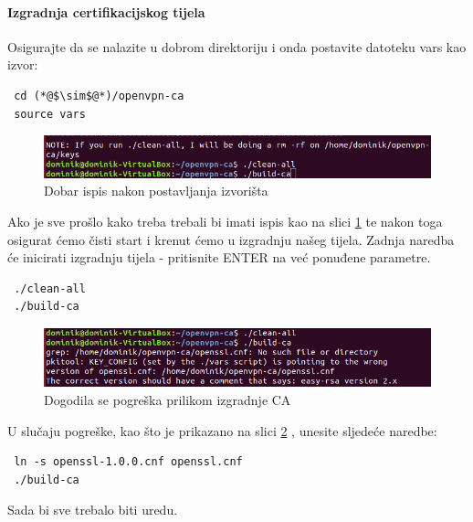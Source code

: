 \bigbreak
\paragraph*{Izgradnja certifikacijskog tijela}
\hfill \smallbreak
Osigurajte da se nalazite u dobrom direktoriju i onda postavite datoteku vars kao izvor:
\begin{lstlisting}
 cd (*@$\sim$@*)/openvpn-ca
 source vars
\end{lstlisting}

\begin{figure}[h]
	\centering
	\includegraphics[width=0.7\linewidth]{"slike/OpenVPN/Screenshot from 2018-12-14 18-32-06"}
	\caption[Dobar ispis nakon postavljanja izvorišta]{Dobar ispis nakon postavljanja izvorišta}
	\label{fig:screenshot-from-2018-12-14-18-32-06}
\end{figure}


Ako je sve prošlo kako treba trebali bi imati ispis kao na slici \ref{fig:screenshot-from-2018-12-14-18-32-06} te nakon toga osigurat ćemo čisti start i krenut ćemo u izgradnju našeg tijela. Zadnja naredba će inicirati izgradnju tijela - pritisnite ENTER na već ponuđene parametre.
\begin{lstlisting}
 ./clean-all
 ./build-ca
\end{lstlisting}

\begin{figure}[h]
	\centering
	\includegraphics[width=0.7\linewidth]{"slike/OpenVPN/Screenshot from 2018-12-14 18-40-25"}
	\caption[Dogodila se pogreška prilikom izgradnje CA]{Dogodila se pogreška prilikom izgradnje CA}
	\label{fig:screenshot-from-2018-12-14-18-40-25}
\end{figure}


U slučaju pogreške, kao što je prikazano na slici \ref{fig:screenshot-from-2018-12-14-18-40-25} , unesite sljedeće naredbe:
\begin{lstlisting}
 ln -s openssl-1.0.0.cnf openssl.cnf
 ./build-ca
\end{lstlisting}
Sada bi sve trebalo biti uredu.\\

